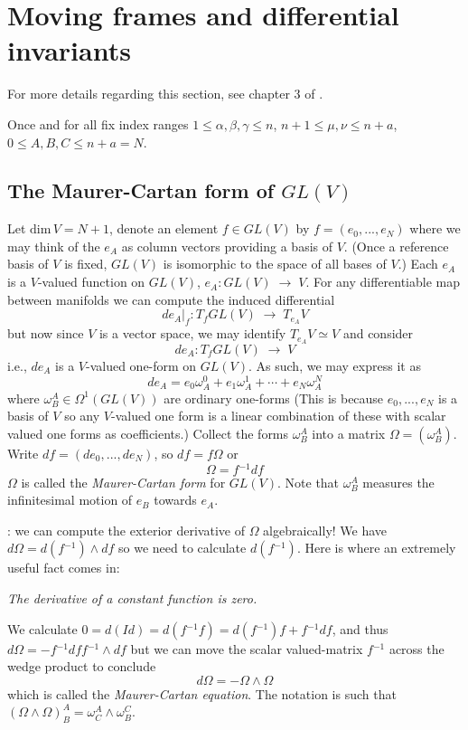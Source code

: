 \documentclass[11pt]{amsart}
\theoremstyle{definition}
\theoremstyle{remark}
\numberwithin{equation}{section}
\def\na{n+\alpha}
\def\ooo#1#2{\omega^{#1}_{#2}}\def\xxx#1#2{x^{#1}_{#2}}
\def\tdim{\rm dim}
\def\hd{,...,}
\def\ww{\wedge}
\def\na{n+a}
\def\inv{{}^{-1}}
\def\a{\alpha}
\def\b{\beta}
\def\g{\gamma}
\def\ra{{\mathord{\;\rightarrow\;}}}
\def\tdim{\text{dim}\,}
\begin{document}
\section{Moving frames and differential invariants}\label{movingframesect}
For more details regarding this section, see chapter 3 of \cite{EDSBK}. 

Once and for all fix index ranges $1\leq \a,\b,\g\leq n$, $n+1\leq
\mu,\nu\leq\na$, $0\leq A,B,C\leq n+a=N$.

\subsection{The Maurer-Cartan form of $GL(V)$}
Let $\tdim V=N+1$,
denote an element $f\in GL(V)$ by $f=(e_0\hd e_N)$ where we may think
of the $e_A$ as column vectors providing a basis of $V$. (Once a reference
basis of $V$ is fixed, $GL(V)$ is isomorphic to the space of all bases of $V$.) 
Each $e_A$ is a $V$-valued function on $GL(V)$,
$e_A: GL(V)\ra V$. For any differentiable map between manifolds
we can compute the induced differential
$$
de_A|_f: T_fGL(V)\ra T_{e_A}V
$$
but now since $V$ is a vector space, we may identify $T_{e_A}V\simeq V$ and
consider
$$
de_A: T_fGL(V)\ra V
$$
i.e., $de_A$ is a $V$-valued one-form on $GL(V)$.
As such, we may express it as
$$
de_A=e_0\ooo 0A + e_1\ooo 1A+\cdots + e_N\ooo NA
$$
where $\ooo AB\in \Omega^1(GL(V))$ are ordinary one-forms (This is
because $e_0\hd e_N$ is a basis of $V$ so any $V$-valued one
form is a linear combination of these with scalar valued one
forms as coefficients.) Collect the forms $\ooo AB$ into a matrix
$\Omega= (\ooo AB)$. Write $df=(de_0\hd de_N)$, so $df=f\Omega$ or
$$
\Omega= f\inv df
$$
$\Omega$ is called the {\it Maurer-Cartan form} for $GL(V)$.
Note that $\ooo AB$ measures the infinitesimal motion of
$e_B$ towards $e_A$.


: we can compute the exterior derivative of $\Omega$ algebraically!
We have $d\Omega= d(f\inv)\ww df$ so we need to calculate
$d(f\inv)$. Here is where an extremely useful fact 
 comes in:
 
 \medskip

{\it The derivative of a constant function is zero.}

\medskip

We calculate $0=d(Id)=d(f\inv f)=d(f\inv)f+f\inv df$, and thus
$d\Omega=-f\inv df f\inv \ww df$ but we can move the scalar valued-matrix
$f\inv$ across the wedge product to conclude
$$
d\Omega = -\Omega\ww \Omega
$$ 
which is called the {\it Maurer-Cartan equation}.
The notation is such that $(\Omega \ww  \Omega)^A_B=\ooo AC\ww \ooo CB$.
\end{document}
